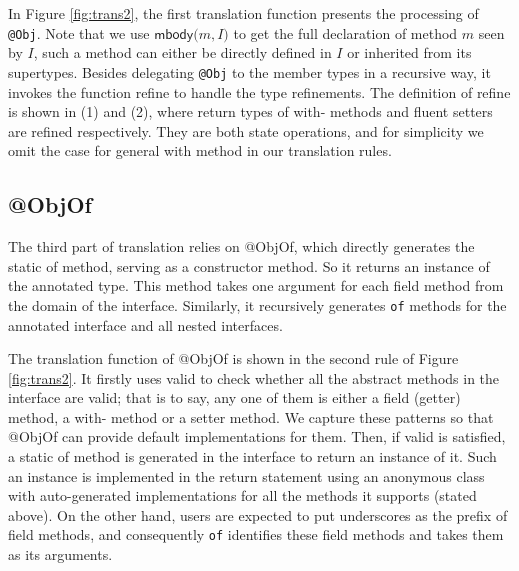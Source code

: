 In Figure \ref{fig:trans2}, the first translation function presents the processing of \lstinline{@Obj}. Note that we use $\textsf{mbody(}m,I\textsf{)}$ to get the full declaration of method $m$ seen by $I$, such a method can either be directly defined in $I$ or inherited from its supertypes. Besides delegating \lstinline{@Obj} to the member types in a recursive way, it invokes the function \textsf{refine} to handle the type refinements. The definition of \textsf{refine} is shown in (1) and (2), where return types of \textsf{with-} methods and fluent setters are refined respectively. They are both state operations, and for simplicity we omit the case for general \textsf{with} method in our translation rules.

\subsection{\textsf{@ObjOf}}
The third part of translation relies on \textsf{@ObjOf}, which directly generates the static \textsf{of} method, serving as a constructor method. So it returns an instance of the annotated type. This method takes one argument for each field method from the domain of the interface. Similarly, it recursively generates \lstinline{of} methods for the annotated interface and all nested interfaces.

The translation function of \textsf{@ObjOf} is shown in the second rule of Figure \ref{fig:trans2}. It firstly uses \textsf{valid} to check whether all the abstract methods in the interface are valid; that is to say, any one of them is either a field (getter) method, a \textsf{with-} method or a setter method. We capture these patterns so that \textsf{@ObjOf} can provide default implementations for them. Then, if \textsf{valid} is satisfied, a static \textsf{of} method is generated in the interface to return an instance of it. Such an instance is implemented in the return statement using an anonymous class with auto-generated
implementations for all the methods it supports (stated above). On the other hand, users are expected to put underscores as the
prefix of field methods, and consequently \lstinline{of} identifies these field methods and takes them as its arguments.

